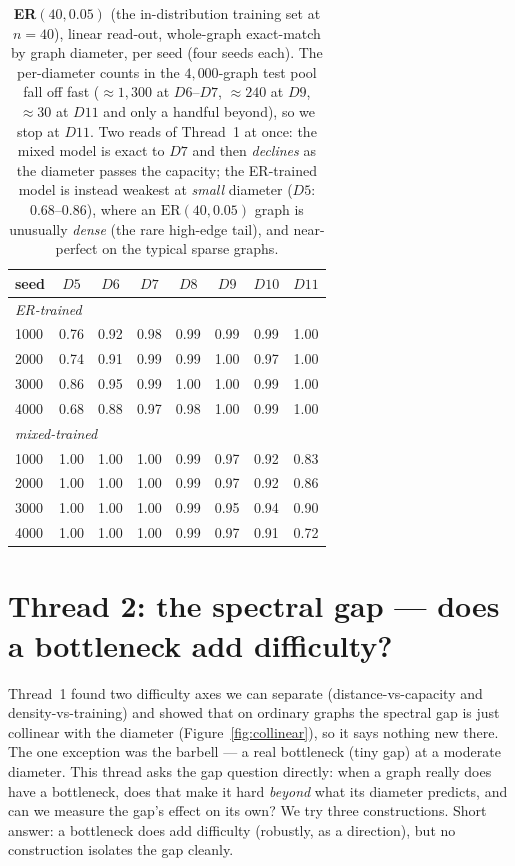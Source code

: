 \documentclass[11pt,a4paper]{article}
\begin{document}
\begin{table}[H]\centering\small
\begin{tabular}{lccccccc}
\toprule
seed & $D5$ & $D6$ & $D7$ & $D8$ & $D9$ & $D10$ & $D11$ \\
\midrule
\multicolumn{8}{l}{\emph{ER-trained}}\\
1000 & 0.76 & 0.92 & 0.98 & 0.99 & 0.99 & 0.99 & 1.00 \\
2000 & 0.74 & 0.91 & 0.99 & 0.99 & 1.00 & 0.97 & 1.00 \\
3000 & 0.86 & 0.95 & 0.99 & 1.00 & 1.00 & 0.99 & 1.00 \\
4000 & 0.68 & 0.88 & 0.97 & 0.98 & 1.00 & 0.99 & 1.00 \\
\midrule
\multicolumn{8}{l}{\emph{mixed-trained}}\\
1000 & 1.00 & 1.00 & 1.00 & 0.99 & 0.97 & 0.92 & 0.83 \\
2000 & 1.00 & 1.00 & 1.00 & 0.99 & 0.97 & 0.92 & 0.86 \\
3000 & 1.00 & 1.00 & 1.00 & 0.99 & 0.95 & 0.94 & 0.90 \\
4000 & 1.00 & 1.00 & 1.00 & 0.99 & 0.97 & 0.91 & 0.72 \\
\bottomrule\end{tabular}
\caption{\textbf{ER}$(40,0.05)$ (the in-distribution training set at $n=40$), linear read-out,
whole-graph exact-match by graph diameter, per seed (four seeds each). The per-diameter counts in
the $4{,}000$-graph test pool fall off fast ($\approx1{,}300$ at $D6$--$D7$, $\approx240$ at $D9$,
$\approx30$ at $D11$ and only a handful beyond), so we stop at $D11$. Two reads of Thread~1 at
once: the mixed model is exact to $D7$ and then \emph{declines} as the diameter passes the
capacity; the ER-trained
model is instead weakest at \emph{small} diameter ($D5$: $0.68$--$0.86$), where an
$\mathrm{ER}(40,0.05)$ graph is unusually \emph{dense} (the rare high-edge tail), and near-perfect
on the typical sparse graphs.}
\label{tab:byd_er_n40}
\end{table}

\section{Thread 2: the spectral gap --- does a bottleneck add difficulty?}
\label{sec:gap}

Thread~1 found two difficulty axes we can separate (distance-vs-capacity and
density-vs-training) and showed that on ordinary graphs the spectral gap is just collinear with
the diameter (Figure~\ref{fig:collinear}), so it says nothing new there. The one exception was
the barbell --- a real bottleneck (tiny gap) at a moderate diameter. This thread asks the gap
question directly: when a graph really does have a bottleneck, does that make it hard
\emph{beyond} what its diameter predicts, and can we measure the gap's effect on its own? We try
three constructions. Short answer: a bottleneck does add difficulty (robustly, as a direction),
but no construction isolates the gap cleanly.
\end{document}
